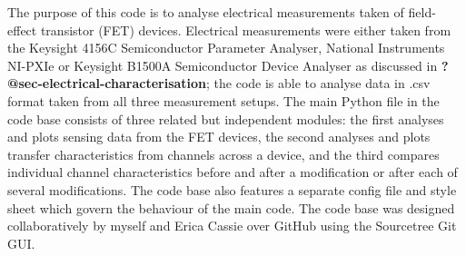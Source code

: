 \documentclass[
  a4paper,
]{scrbook}
\begin{document}
The purpose of this code is to analyse electrical measurements taken of
field-effect transistor (FET) devices. Electrical measurements were
either taken from the Keysight 4156C Semiconductor Parameter Analyser,
National Instruments NI-PXIe or Keysight B1500A Semiconductor Device
Analyser as discussed in \textbf{?@sec-electrical-characterisation}; the
code is able to analyse data in .csv format taken from all three
measurement setups. The main Python file in the code base consists of
three related but independent modules: the first analyses and plots
sensing data from the FET devices, the second analyses and plots
transfer characteristics from channels across a device, and the third
compares individual channel characteristics before and after a
modification or after each of several modifications. The code base also
features a separate config file and style sheet which govern the
behaviour of the main code. The code base was designed collaboratively
by myself and Erica Cassie over GitHub using the Sourcetree Git GUI.


\backmatter
\printbibliography
\end{document}
